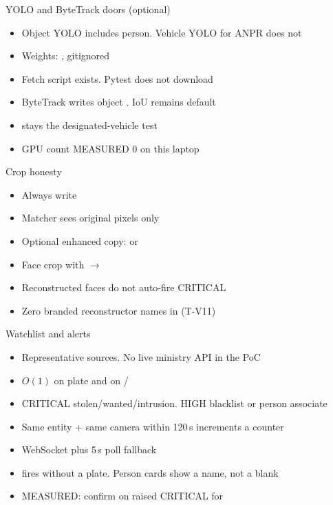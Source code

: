 \documentclass[aspectratio=169,11pt]{beamer}
\begin{document}
\begin{frame}{YOLO and ByteTrack doors (optional)}
\begin{itemize}\itemsep0.55em
\item Object YOLO includes person. Vehicle YOLO for ANPR does not
\item Weights: , gitignored
\item Fetch script exists. Pytest does not download
\item ByteTrack writes object . IoU remains default
\item {} stays the designated-vehicle test
\item GPU count MEASURED 0 on this laptop
\end{itemize}
\end{frame}

\begin{frame}{Crop honesty}
\begin{itemize}\itemsep0.55em
\item Always write 
\item Matcher sees original pixels only
\item Optional enhanced copy:  or 
\item Face crop with  $\to$ 
\item Reconstructed faces do not auto-fire CRITICAL
\item Zero branded reconstructor names in  (T-V11)
\end{itemize}
\end{frame}

\begin{frame}{Watchlist and alerts}
\begin{itemize}\itemsep0.55em
\item Representative sources. No live ministry API in the PoC
\item $O(1)$ on plate and on  / 
\item CRITICAL stolen/wanted/intrusion. HIGH blacklist or person associate
\item Same entity + same camera within 120\,s increments a counter
\item WebSocket  plus 5\,s poll fallback
\item {} fires without a plate. Person cards show a name, not a blank
\item MEASURED: confirm on  raised CRITICAL for 
\end{itemize}
\end{frame}
\end{document}
